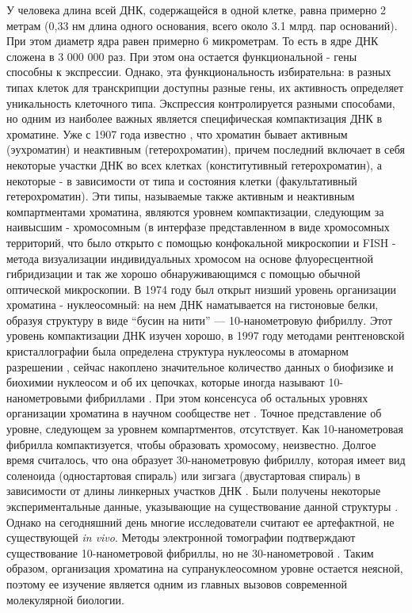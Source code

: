     У человека длина всей  ДНК, содержащейся в одной клетке,  равна примерно 2 метрам (0,33 нм длина одного основания, всего около 3.1 млрд. пар оснований). При этом диаметр ядра равен примерно 6 микрометрам. То есть в ядре  ДНК сложена в 3 000 000 раз. При этом она остается функциональной -  гены способны к экспрессии. Однако, эта функциональность избирательна: в разных типах клеток для транскрипции доступны разные гены, их активность определяет уникальность клеточного типа.  Экспрессия контролируется разными способами, но одним  из наиболее важных является специфическая компактизация ДНК в хроматине. Уже с 1907 года известно \cite{gutherz_s._zur_nodate}, что хроматин бывает активным (эухроматин) и неактивным (гетерохроматин), причем последний включает в себя некоторые участки ДНК во всех клетках (конститутивный гетерохроматин), а некоторые - в зависимости от типа и состояния клетки (факультативный гетерохроматин). Эти типы, называемые также активным и неактивным компартментами хроматина, являются уровнем компактизации, следующим за наивысшим - хромосомным (в интерфазе представленном в виде хромосомных территорий, что было открыто с помощью конфокальной микроскопии и FISH -  метода визуализации индивидуальных хромосом на основе флуоресцентной гибридизации и так же хорошо обнаруживающимся с помощью обычной оптической микроскопии. В 1974 году был открыт \cite{kornberg_chromatin_1974-1} низший уровень организации хроматина - нуклеосомный: на нем ДНК наматывается на гистоновые белки, образуя структуру в виде ``бусин на нити'' — 10-нанометровую фибриллу. Этот уровень компактизации ДНК изучен хорошо, в 1997 году методами рентгеновской кристаллографии была определена структура нуклеосомы в атомарном разрешении \cite{luger_crystal_1997}, сейчас накоплено значительное количество данных о биофизике и биохимии нуклеосом и об их цепочках, которые иногда называют 10-нанометровыми фибриллами \cite{hansen_10-nm_2018}. При этом консенсуса об остальных уровнях организации хроматина в научном сообществе нет \cite{maeshima_chromatin_2014,fraser_overview_2015}. Точное представление об уровне, следующем за уровнем компартментов, отсутствует. Как 10-нанометровая фибрилла компактизуется, чтобы образовать хромосому, неизвестно. Долгое время считалось, что она образует 30-нанометровую фибриллу, которая имеет вид соленоида (одностартовая спираль) или зигзага (двустартовая спираль) в зависимости от длины линкерных участков ДНК \cite{perisic_modeling_2010}. Были получены некоторые экспериментальные данные, указывающие на существование данной структуры \cite{tremethick_higher-order_2007,rydberg_chromatin_1998}. Однако на сегодняшний день многие исследователи считают ее артефактной, не существующей \textit{in vivo}. Методы электронной томографии подтверждают существование 10-нанометровой фибриллы, но не 30-нанометровой \cite{razin_chromatin_2014,joti_chromosomes_2012}. Таким образом, организация хроматина на супрануклеосомном уровне остается неясной, поэтому ее изучение является одним из главных вызовов современной молекулярной биологии. 
    
